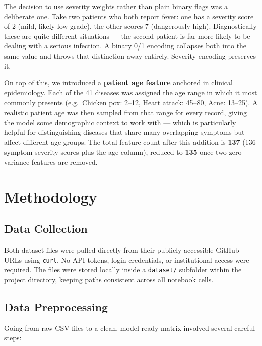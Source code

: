 \documentclass[12pt,a4paper]{article}
\begin{document}
The decision to use severity weights rather than plain binary flags was a deliberate one. Take two patients who both report fever: one has a severity score of 2 (mild, likely low-grade), the other scores 7 (dangerously high). Diagnostically these are quite different situations --- the second patient is far more likely to be dealing with a serious infection. A binary 0/1 encoding collapses both into the same value and throws that distinction away entirely. Severity encoding preserves it.

On top of this, we introduced a \textbf{patient age feature} anchored in clinical epidemiology. Each of the 41 diseases was assigned the age range in which it most commonly presents (e.g.\ Chicken pox: 2--12, Heart attack: 45--80, Acne: 13--25). A realistic patient age was then sampled from that range for every record, giving the model some demographic context to work with --- which is particularly helpful for distinguishing diseases that share many overlapping symptoms but affect different age groups. The total feature count after this addition is \textbf{137} (136 symptom severity scores plus the age column), reduced to \textbf{135} once two zero-variance features are removed.

\section{Methodology}
\label{sec:methodology}

\subsection{Data Collection}
Both dataset files were pulled directly from their publicly accessible GitHub URLs using \texttt{curl}. No API tokens, login credentials, or institutional access were required. The files were stored locally inside a \texttt{dataset/} subfolder within the project directory, keeping paths consistent across all notebook cells.

\subsection{Data Preprocessing}
\label{subsec:preprocess}

Going from raw CSV files to a clean, model-ready matrix involved several careful steps:
\end{document}
